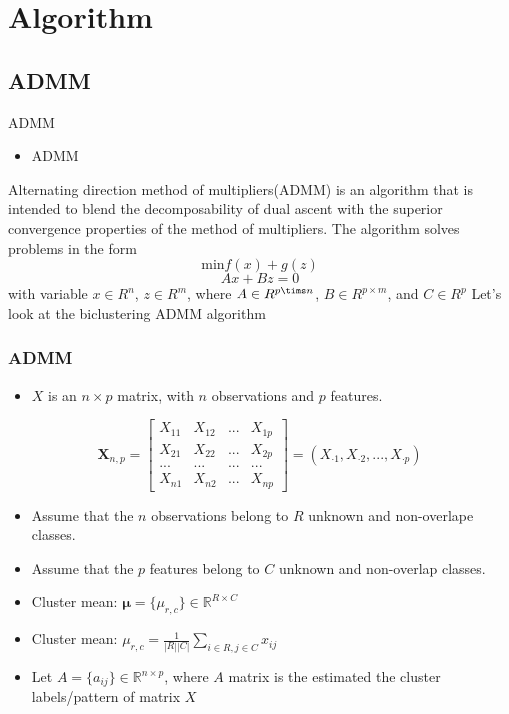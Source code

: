 \documentclass{beamer}
\begin{document}
\section{Algorithm}
\subsection{ADMM}

\begin{frame}{ADMM}

\begin{itemize}
    \item ADMM
\end{itemize}

    Alternating direction method of multipliers(ADMM) is an algorithm that is intended to blend the decomposability
of dual ascent with the superior convergence properties of the method
of multipliers. The algorithm solves problems in the form
$$\text{min} f(x) + g(z)$$
$$Ax + Bz = 0$$
with variable $x \in R^n$, $z \in R^m$, where $A \in R^{p \tims n}$, $B \in R^{p \times m}$, and $C \in R^p$
\vfill
Let's look at the biclustering ADMM algorithm 

\end{frame}



\begin{frame}
\frametitle{ADMM}
\begin{itemize}
    \item $X$ is an $n \times p$ matrix, with $n$ observations and $p$ features.
\end{itemize}
 
$$\mathbf{X}_{n,p} = \left[\begin{array}
{rrrr}
X_{11} & X_{12} & ... & X_{1p}\\
X_{21} & X_{22} & ... & X_{2p}\\
... & ... & ... & ... \\
X_{n1} & X_{n2} & ... & X_{np}
\end{array}\right] = (X_{\cdot 1}, X_{\cdot 2},..., X_{\cdot p})$$

\begin{itemize}
    \item Assume that the $n$ observations belong to $R$ unknown and non-overlape classes. 
    \item Assume that the $p$ features belong to $C$ unknown and non-overlap classes.
    \item Cluster mean: $\mathbf{\mu} = \{\mu_{r,c}\} \in \mathbb{R}^{R \times C}$
    \item Cluster mean: $\mu_{r,c} = \frac{1}{|R||C|} \sum_{i \in R, j \in C} x_{ij}$
    \item Let $A = \{a_{ij}\} \in \mathbb{R}^{n \times p}$, where $A$ matrix is the estimated the cluster labels/pattern of matrix $X$
\end{itemize}
\end{frame}
\end{document}
